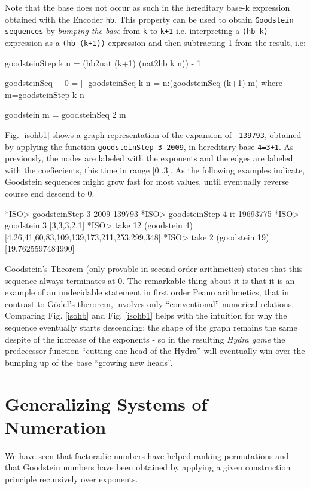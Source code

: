 \documentclass[]{INCLUDES/llncs}
\begin{document}
Note that the base does not occur as such in the hereditary base-k
expression obtained with the Encoder {\tt hb}. This property can be used to
obtain {\tt Goodstein sequences} by {\em bumping the base} from {\tt k} to
{\tt k+1} i.e. interpreting a {\tt (hb k)} expression as a {\tt (hb (k+1))}
expression and then subtracting 1 from the result, i.e:
\begin{code}
goodsteinStep k n = (hb2nat (k+1) (nat2hb k n)) - 1

goodsteinSeq _ 0 = []
goodsteinSeq k n = n:(goodsteinSeq (k+1) m) where 
  m=goodsteinStep k n
  
goodstein m = goodsteinSeq 2 m
\end{code}
Fig. \ref{isohb1} shows a graph representation of the expansion of {\tt
139793}, obtained by applying the function {\tt goodsteinStep 3 2009}, in
hereditary base {\tt 4=3+1}. As previously, the nodes are labeled with the
exponents and the edges are labeled with the coefiecients, this time in range
[0..3].
As the following examples indicate, Goodstein sequences might grow fast
for most values, until eventually reverse course end descend to 0.
\begin{codex}
*ISO> goodsteinStep 3 2009
139793
*ISO> goodsteinStep 4 it
19693775
*ISO> goodstein 3
[3,3,3,2,1]
*ISO> take 12 (goodstein 4)
[4,26,41,60,83,109,139,173,211,253,299,348]
*ISO> take 2 (goodstein 19)
[19,7625597484990]
\end{codex}
Goodstein's Theorem (only provable in second order arithmetics) states that this
sequence always terminates at 0. The remarkable thing about it is that it is 
an example of an undecidable statement in first order Peano arithmetics, that in
contrast to G\"{o}del's therorem, involves only ``conventional'' numerical relations.
Comparing Fig. \ref{isohb} and Fig. \ref{isohb1} helps with the intuition for
why the sequence eventually starts descending: the shape of the graph
remains the same despite of the increase of the exponents - so in the resulting
{\em Hydra game} the predecessor function ``cutting one head of the Hydra'' will
eventually win over the bumping up of the base ``growing new heads''.

\section{Generalizing Systems of Numeration}

We have seen that factoradic numbers have helped ranking permutations and that
Goodstein numbers have been obtained by applying a given construction
principle recursively over exponents.  
\end{document}

